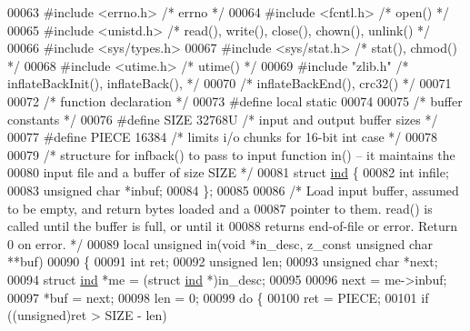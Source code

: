 \begin{DoxyCode}
00063 \textcolor{preprocessor}{#include <errno.h>}          \textcolor{comment}{/* errno */}
00064 \textcolor{preprocessor}{#include <fcntl.h>}          \textcolor{comment}{/* open() */}
00065 \textcolor{preprocessor}{#include <unistd.h>}         \textcolor{comment}{/* read(), write(), close(), chown(), unlink() */}
00066 \textcolor{preprocessor}{#include <sys/types.h>}
00067 \textcolor{preprocessor}{#include <sys/stat.h>}       \textcolor{comment}{/* stat(), chmod() */}
00068 \textcolor{preprocessor}{#include <utime.h>}          \textcolor{comment}{/* utime() */}
00069 \textcolor{preprocessor}{#include "zlib.h"}           \textcolor{comment}{/* inflateBackInit(), inflateBack(), */}
00070                             \textcolor{comment}{/* inflateBackEnd(), crc32() */}
00071 
00072 \textcolor{comment}{/* function declaration */}
00073 \textcolor{preprocessor}{#define local static}
00074 
00075 \textcolor{comment}{/* buffer constants */}
00076 \textcolor{preprocessor}{#define SIZE 32768U         }\textcolor{comment}{/* input and output buffer sizes */}\textcolor{preprocessor}{}
00077 \textcolor{preprocessor}{#define PIECE 16384         }\textcolor{comment}{/* limits i/o chunks for 16-bit int case */}\textcolor{preprocessor}{}
00078 
00079 \textcolor{comment}{/* structure for infback() to pass to input function in() -- it maintains the}
00080 \textcolor{comment}{   input file and a buffer of size SIZE */}
00081 \textcolor{keyword}{struct }\hyperlink{structind}{ind} \{
00082     \textcolor{keywordtype}{int} infile;
00083     \textcolor{keywordtype}{unsigned} \textcolor{keywordtype}{char} *inbuf;
00084 \};
00085 
00086 \textcolor{comment}{/* Load input buffer, assumed to be empty, and return bytes loaded and a}
00087 \textcolor{comment}{   pointer to them.  read() is called until the buffer is full, or until it}
00088 \textcolor{comment}{   returns end-of-file or error.  Return 0 on error. */}
00089 local \textcolor{keywordtype}{unsigned} in(\textcolor{keywordtype}{void} *in\_desc, z\_const \textcolor{keywordtype}{unsigned} \textcolor{keywordtype}{char} **buf)
00090 \{
00091     \textcolor{keywordtype}{int} ret;
00092     \textcolor{keywordtype}{unsigned} len;
00093     \textcolor{keywordtype}{unsigned} \textcolor{keywordtype}{char} *next;
00094     \textcolor{keyword}{struct }\hyperlink{structind}{ind} *me = (\textcolor{keyword}{struct }\hyperlink{structind}{ind} *)in\_desc;
00095 
00096     next = me->inbuf;
00097     *buf = next;
00098     len = 0;
00099     \textcolor{keywordflow}{do} \{
00100         ret = PIECE;
00101         \textcolor{keywordflow}{if} ((\textcolor{keywordtype}{unsigned})ret > SIZE - len)

\end{DoxyCode}
